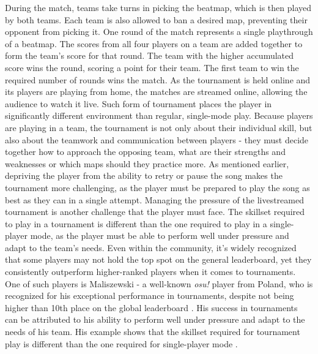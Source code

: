 During the match, teams take turns in picking the beatmap, which is then played by both teams. Each team is also allowed to ban a desired map, preventing their opponent from picking it. One round of the match represents a single playthrough of a beatmap. The scores from all four players on a team are added together to form the team’s score for that round. The team with the higher accumulated score wins the round, scoring a point for their team. The first team to win the required number of rounds wins the match. As the tournament is held online and its players are playing from home, the matches are streamed online, allowing the audience to watch it live.
Such form of tournament places the player in significantly different environment than regular, single-mode play. Because players are playing in a team, the tournament is not only about their individual skill, but also about the teamwork and communication between players - they must decide together how to approach the opposing team, what are their strengths and weaknesses or which maps should they practice more. As mentioned earlier, depriving the player from the ability to retry or pause the song makes the tournament more challenging, as the player must be prepared to play the song as best as they can in a single attempt. Managing the pressure of the livestreamed tournament is another challenge that the player must face. The skillset required to play in a tournament is different than the one required to play in a single-player mode, as the player must be able to perform well under pressure and adapt to the team’s needs. Even within the community, it's widely recognized that some players may not hold the top spot on the general leaderboard, yet they consistently outperform higher-ranked players when it comes to tournaments. One of such players is Maliszewski - a well-known \textit{osu!} player from Poland, who is recognized for his exceptional performance in tournaments, despite not being higher than 10th place on the global leaderboard \cite{maliszewskiliquid}. His success in tournaments can be attributed to his ability to perform well under pressure and adapt to the needs of his team. His example shows that the skillset required for tournament play is different than the one required for single-player mode \cite{maliszewski}.

